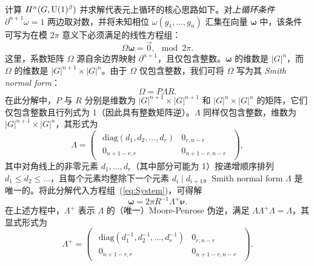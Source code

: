 \bigskip\noindent 计算 $H^n(G,{\rm U}(1)^\beta)$ 并求解代表元上循环的核心思路如下。对\emph{上循环条件} $\partial^{n+1}\omega=1$ 两边取对数，并将未知相位 $\omega(g_1,\dots,g_n)$ 汇集在向量 $\bm{\omega}$ 中，该条件可写为在模 $2\pi$ 意义下必须满足的线性方程组：
\begin{equation}
	\Omega \bm{\omega} = \vec{0}, \mod 2\pi.
	\label{eq:System}
\end{equation}
这里，系数矩阵 $\Omega$ 源自余边界映射 $\partial^{n+1}$，且仅包含整数。$\bm{\omega}$ 的维数是 $|G|^n$，而 $\Omega$ 的维数是 $|G|^{n+1}\times|G|^n$。由于 $\Omega$ 仅包含整数，我们可将 $\Omega$ 写为其 \emph{Smith normal form}：
\begin{equation}
	\Omega = P\Lambda R.
\end{equation}
在此分解中，$P$ 与 $R$ 分别是维数为 $\left|G\right|^{n+1}\times \left|G\right|^{n+1}$ 和 $\left|G\right|^n\times \left|G\right|^n$ 的矩阵，它们仅包含整数且行列式为 1（因此具有整数矩阵逆）。$\Lambda$ 同样仅包含整数，维数为 $\left|G\right|^{n+1}\times \left|G\right|^n$，其形式为
\begin{equation}
	\Lambda
	=
	\begin{pmatrix}
		\begin{array}{c|c}
			\text{diag}\left(d_1,d_2,...,d_r\right) & 0_{r,n-r} \\
		      \hline
		      0_{n+1-r,r} & 0_{n+1-r,n-r}
		\end{array}
	\end{pmatrix}
	,
\end{equation}
其中对角线上的非零元素 $d_1,...,d_r$（其中部分可能为 1）按递增顺序排列 $d_1\leq d_2\leq...$，且每个元素均整除下一个元素 $d_i \mid d_{i+1}$。Smith normal form $\Lambda$ 是唯一的。将此分解代入方程组~(\ref{eq:System})，可得解
\begin{equation}
	\bm{\omega} = 2\pi R^{-1}\Lambda^+\bm{\nu}.
	\label{eq:Sol2Cocyc}
\end{equation}
在上述方程中，$\Lambda^+$ 表示 $\Lambda$ 的（唯一）Moore-Penrose 伪逆，满足 $\Lambda\Lambda^+\Lambda = \Lambda$，其显式形式为
\begin{equation}
	\Lambda^+
	=
	\begin{pmatrix}
		\begin{array}{c|c}    \text{diag}\left(d_1^{-1},d_2^{-1},...,d_r^{-1}\right) & 0_{r,n-r} \\
		\hline
		0_{n+1-r,r} & 0_{n+1-r,n-r}
		\end{array}
	\end{pmatrix}.
\end{equation}
